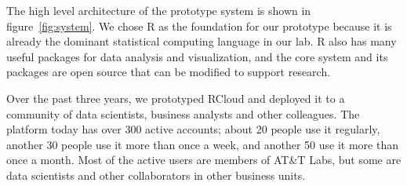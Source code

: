 The high level architecture of the prototype system
is shown in figure~\ref{fig:system}.
We chose R as the foundation for our prototype because it is already
the dominant statistical computing language in our lab.
R also has many useful packages for data analysis and visualization,
and the core system and its packages are open source that can be modified to
support research. 

Over the past three years, we prototyped RCloud and deployed it to
a community of data scientists, business analysts and other colleagues.  The
platform today has over 300 active accounts; about 20 people use it regularly,
another 30 people use it more than once a week, and another 50 use it more than
once a month.  Most of the
active users are members of AT\&T Labs, but some are data scientists and other
collaborators in other business units.
